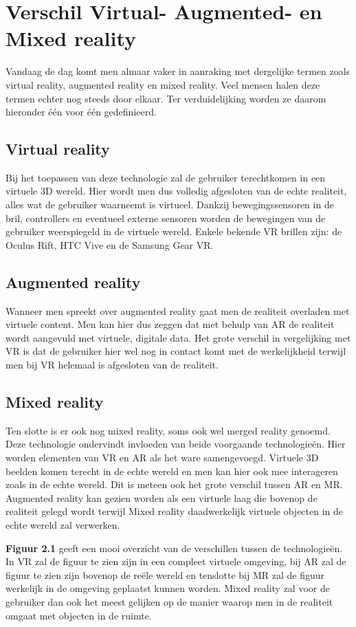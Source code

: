 \section{Verschil Virtual- Augmented- en Mixed reality}
Vandaag de dag komt men almaar vaker in aanraking met dergelijke termen zoals virtual reality, augmented reality en mixed reality. Veel mensen halen deze termen echter nog steeds door elkaar. Ter verduidelijking worden ze daarom hieronder één voor één gedefinieerd. 

\subsection{Virtual reality}
Bij het toepassen van deze technologie zal de gebruiker terechtkomen in een virtuele 3D wereld. Hier wordt men dus volledig afgesloten van de echte realiteit, alles wat de gebruiker waarneemt is virtueel. Dankzij bewegingssensoren in de bril, controllers en eventueel externe sensoren worden de bewegingen van de gebruiker weerspiegeld in de virtuele wereld. Enkele bekende VR brillen zijn: de Oculus Rift, HTC Vive en de Samsung Gear VR.

\subsection{Augmented reality}
Wanneer men spreekt over augmented reality gaat men de realiteit overladen met virtuele content. Men kan hier dus zeggen dat met behulp van AR de realiteit wordt aangevuld met virtuele, digitale data. Het grote verschil in vergelijking met VR is dat de gebruiker hier wel nog in contact komt met de werkelijkheid terwijl men bij VR helemaal is afgesloten van de realiteit.

\subsection{Mixed reality}
Ten slotte is er ook nog mixed reality, soms ook wel merged reality genoemd. Deze technologie ondervindt invloeden van beide voorgaande technologieën. Hier worden elementen van VR en AR als het ware samengevoegd. Virtuele 3D beelden komen terecht in de echte wereld en men kan hier ook mee interageren zoals in de echte wereld. Dit is meteen ook het grote verschil tussen AR en MR. Augmented reality kan gezien worden als een virtuele laag die bovenop de realiteit gelegd wordt terwijl Mixed reality daadwerkelijk virtuele objecten in de echte wereld zal verwerken.

\textbf{Figuur 2.1} geeft een mooi overzicht van de verschillen tussen de technologieën. In VR zal de figuur te zien zijn in een compleet virtuele omgeving, bij AR zal de figuur te zien zijn bovenop de reële wereld en tenslotte bij MR zal de figuur werkelijk in de omgeving geplaatst kunnen worden. Mixed reality zal voor de gebruiker dan ook het meest gelijken op de manier waarop men in de realiteit omgaat met objecten in de ruimte.

